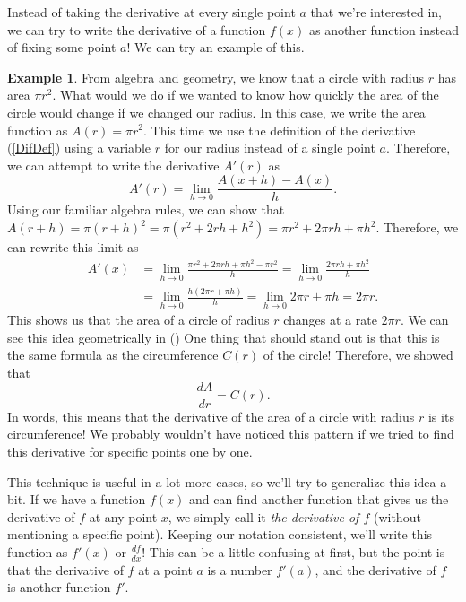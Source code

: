 \documentclass[12pt]{article}
\newcommand{\diff}[2]{\frac{d #1}{d #2} }
\theoremstyle{definition}
\newtheorem{exmp}[thm]{Example}
\theoremstyle{plain}
\numberwithin{equation}{section}
\begin{document}

Instead of taking the derivative at every single point $a$ that we're interested in, we can try to write the derivative of a function $f(x)$ as another function instead of fixing some point $a$! We can try an example of this.

\begin{exmp}
  From algebra and geometry, we know that a circle with radius $r$ has area $\pi r^2$. What would we do if we wanted to know how quickly the area of the circle would change if we changed our radius. In this case, we write the area function as $A(r) =  \pi r^2$. This time we use the definition of the derivative (\cref{DifDef}) using a variable $r$ for our radius instead of a single point $a$. Therefore, we can attempt to write the derivative $A'(r)$ as
  \[
  A'(r) = \lim\limits_{h\to 0}\frac{A(x+h)-A(x)}{h}.
  \]
  Using our familiar algebra rules, we can show that $A(r+h) = \pi(r+h)^2 = \pi(r^2 + 2rh + h^2) = \pi r^2 + 2\pi rh + \pi h^2$. Therefore, we can rewrite this limit as
  \begin{align}
  A'(x) & = \lim\limits_{h\to 0}\frac{\pi r^2 + 2\pi rh + \pi h^2 - \pi r^2}{h} =  \lim\limits_{h\to 0}\frac{2\pi rh + \pi h^2}{h}\\
  & = \lim\limits_{h\to 0}\frac{h(2\pi r + \pi h)}{h} = \lim\limits_{h\to 0} 2\pi r + \pi h = 2\pi r.
  \end{align} This shows us that the area of a circle of radius $r$ changes at a rate $2\pi r$. We can see this idea geometrically in ()  One thing that should stand out is that this is the same formula as the circumference $C(r)$ of the circle! Therefore, we showed that
  \[
  \diff{A}{r} = C(r).
  \]  In words, this means that the derivative of the area of a circle with radius $r$ is its circumference! We probably wouldn't have noticed this pattern if we tried to find this derivative for specific points one by one.
\end{exmp}



This technique is useful in a lot more cases, so we'll try to generalize this idea a bit. If we have a function $f(x)$ and can find another function that gives us the derivative of $f$ at any point $x$, we simply call it \emph{the derivative of $f$} (without mentioning a specific point). Keeping our notation consistent, we'll write this function as $f'(x)$ or $\diff{f}{x}$! This can be a little confusing at first, but the point is that the derivative of $f$ at a point $a$ is a number $f'(a)$, and the derivative of $f$ is another function $f'$.
\end{document}

